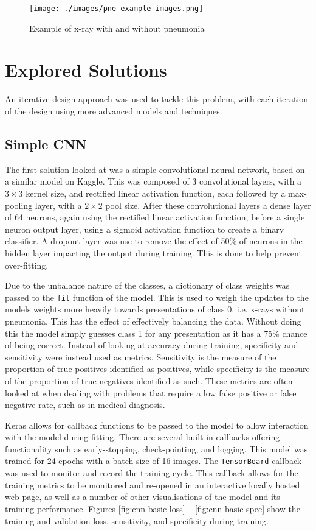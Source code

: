 \documentclass[12pt,a4paper,titlepage,twoside]{report}
\begin{document}
	\begin{figure}[h]
		\centering
		\texttt{[image: ./images/pne-example-images.png]}
		\caption{Example of x-ray with and without pneumonia}
		\label{fig:pne-example-x-rays}
	\end{figure}


\section{Explored Solutions}
	An iterative design approach was used to tackle this problem, with each iteration of the design using more advanced models and techniques.
	\subsection{Simple CNN}
	The first solution looked at was a simple convolutional neural network, based on a similar model on Kaggle\cite{cnn-simple-kaggle}. This was composed of 3 convolutional layers, with a $3\times3$ kernel size, and rectified linear activation function, each followed by a max-pooling layer, with a $2\times2$ pool size. After these convolutional layers a dense layer of 64 neurons, again using the rectified linear activation function, before a single neuron output layer, using a sigmoid activation function to create a binary classifier. A dropout layer was use to remove the effect of 50\% of neurons in the hidden layer impacting the output during training. This is done to help prevent over-fitting\cite{dropout}. \par
	Due to the unbalance nature of the classes, a dictionary of class weights was passed to the \texttt{fit} function of the model. This is used to weigh the updates to the models weights more heavily towards presentations of class 0, i.e. x-rays without pneumonia. This has the effect of effectively balancing the data. Without doing this the model simply guesses class 1 for any presentation as it has a 75\% chance of being correct. Instead of looking at accuracy during training, specificity and sensitivity were instead used as metrics. Sensitivity is the measure of the proportion of true positives identified as positives, while specificity is the measure of the proportion of true negatives identified as such. These metrics are often looked at when dealing with problems that require a low false positive or false negative rate, such as in medical diagnosis. \par
	Keras allows for callback functions to be passed to the model to allow interaction with the model during fitting. There are several built-in callbacks offering functionality such as early-stopping, check-pointing, and logging. This model was trained for 24 epochs with a batch size of 16 images. The \texttt{TensorBoard} callback was used to monitor and record the training cycle. This callback allows for the training metrics to be monitored and re-opened in an interactive locally hosted web-page, as well as a number of other visualisations of the model and its training performance. Figures \ref{fig:cnn-basic-loss} -- \ref{fig:cnn-basic-spec} show the training and validation loss, sensitivity, and specificity during training. 
	
\end{document}
